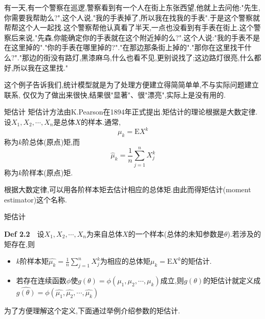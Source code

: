 	\begin{frame}
		有一天,有一个警察在巡逻,警察看到有一个人在街上东张西望,他就上去问他:"先生,你需要我帮助么?",这个人说,"我的手表掉了,所以我在找我的手表".于是这个警察就帮帮这个人一起找.这个警察帮他认真看了半天,一点也没看到有手表在街上.这个警察后来说,"先森,你能确定你的手表就在这个附近掉的么?".这个人说:"我的手表不是在这里掉的"."你的手表在哪里掉的?"."在那边那条街上掉的"."那你在这里找干什么?"."那边的街没有路灯,黑漆麻乌,什么也看不见,更别说找了;这边路灯很亮,什么都好,所以我在这里找."
		
		这个例子告诉我们,统计模型就是为了处理方便建立得简简单单,不与实际问题建立联系,
		仅仅为了做出来很快,结果很"显著"、很"漂亮",实际上是没有用的.
	\end{frame}

	\begin{frame}{矩估计}
		矩估计方法由K.Pearson在1894年正式提出.矩估计的理论根据是大数定律.设$X_1,X_2,\cdots,X_n$是总体$X$的样本.通常,
		\begin{equation}
			\mu_k = \mathrm{E}X^k
		\end{equation}
		称为$k$阶\alert{总体(原点)矩},而
		\begin{equation}
			 \widehat{\mu}_k = \frac{1}{n}\sum_{j=1}^nX_j^k
		\end{equation}
		称为$k$阶\alert{样本(原点)矩}.
		
		根据大数定律,可以用各阶样本矩去估计相应的总体矩.由此而得\alert{矩估计}(moment estimator)这个名称.
	\end{frame}

	\begin{frame}{矩估计}
		\begin{block}{\textbf{Def 2.2}$\quad$设$X_1,X_2,\cdots,X_n$为来自总体$X$的一个样本(总体的未知参数是$\theta$).若涉及的矩存在,则}
			\begin{itemize}
				\item $k$阶样本矩$\widehat{\mu_k} = \frac{1}{n}\sum_{j=1}^nX_j^k$为相应的总体矩$\mu_k = \mathrm{E}X^k$的矩估计.
				\item 若存在连续函数$\phi$使$g(\theta) = \phi(\mu_1,\mu_2,\cdots,\mu_k)$成立,则$g(\theta)$的矩估计就定义成$\widehat{g(\theta)} = \phi(\widehat{\mu_1},\widehat{\mu_2},\cdots,\widehat{\mu_k})$
			\end{itemize}
		\end{block}
		为了方便理解这个定义,下面通过举例介绍参数的矩估计.
	\end{frame}

